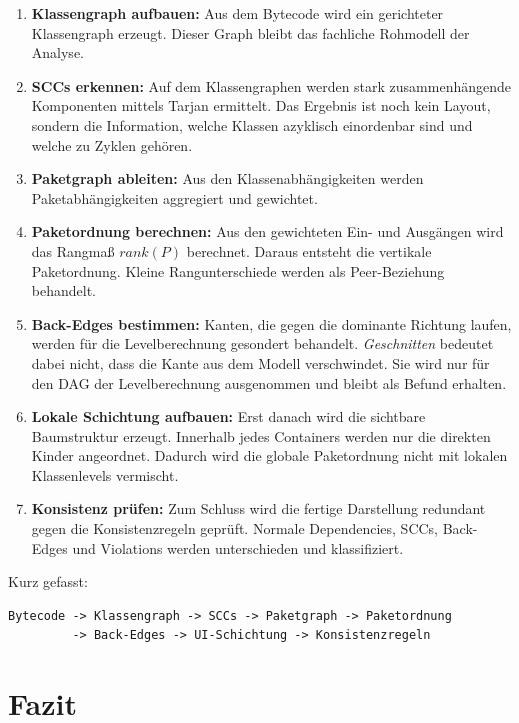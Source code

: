 \documentclass[a4paper,11pt]{article}
\begin{document}
\begin{enumerate}
  \item \textbf{Klassengraph aufbauen:} Aus dem Bytecode wird ein gerichteter
        Klassengraph erzeugt. Dieser Graph bleibt das fachliche Rohmodell der
        Analyse.
  \item \textbf{SCCs erkennen:} Auf dem Klassengraphen werden stark
        zusammenh\"angende Komponenten mittels Tarjan ermittelt. Das Ergebnis
        ist noch kein Layout, sondern die Information, welche Klassen azyklisch
        einordenbar sind und welche zu Zyklen geh\"oren.
  \item \textbf{Paketgraph ableiten:} Aus den Klassenabh\"angigkeiten werden
        Paketabh\"angigkeiten aggregiert und gewichtet.
  \item \textbf{Paketordnung berechnen:} Aus den gewichteten Ein- und Ausg\"angen
        wird das Rangma\ss{} $rank(P)$ berechnet. Daraus entsteht die vertikale
        Paketordnung. Kleine Rangunterschiede werden als Peer-Beziehung behandelt.
  \item \textbf{Back-Edges bestimmen:} Kanten, die gegen die dominante Richtung
        laufen, werden f\"ur die Levelberechnung gesondert behandelt.
        \emph{Geschnitten} bedeutet dabei nicht, dass die Kante aus dem Modell
        verschwindet. Sie wird nur f\"ur den DAG der Levelberechnung ausgenommen
        und bleibt als Befund erhalten.
  \item \textbf{Lokale Schichtung aufbauen:} Erst danach wird die sichtbare
        Baumstruktur erzeugt. Innerhalb jedes Containers werden nur die direkten
        Kinder angeordnet. Dadurch wird die globale Paketordnung nicht mit
        lokalen Klassenlevels vermischt.
  \item \textbf{Konsistenz pr\"ufen:} Zum Schluss wird die fertige Darstellung
        redundant gegen die Konsistenzregeln gepr\"uft. Normale Dependencies,
        SCCs, Back-Edges und Violations werden unterschieden und klassifiziert.
\end{enumerate}

Kurz gefasst:

\begin{lstlisting}
Bytecode -> Klassengraph -> SCCs -> Paketgraph -> Paketordnung
         -> Back-Edges -> UI-Schichtung -> Konsistenzregeln
\end{lstlisting}

\section{Fazit}
\end{document}
